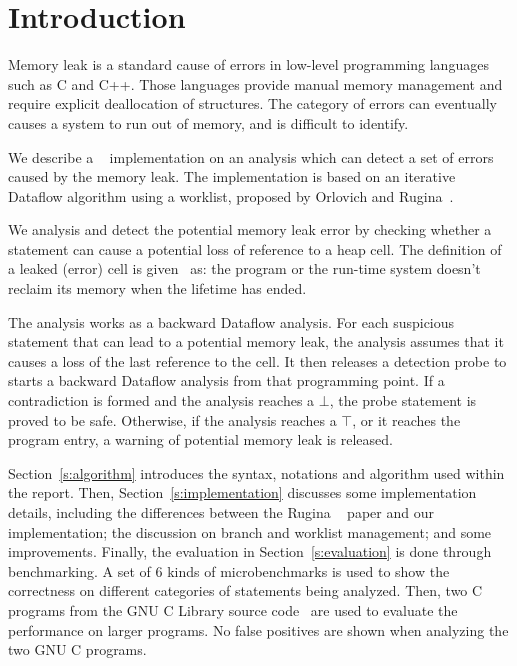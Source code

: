 \section{Introduction}
Memory leak is a standard cause of errors in low-level programming languages
such as C and C++. Those languages provide manual memory management and require
explicit deallocation of structures. The category of errors can eventually
causes a system to run out of memory, and is difficult to identify.

We describe a \llvm~\cite{llvm} implementation on an analysis which
can detect a set of errors caused by the memory leak. The implementation is
based on an iterative Dataflow algorithm using a worklist, proposed by Orlovich 
and Rugina~\cite{rugina}.

We analysis and detect the potential memory leak error
by checking whether a statement can cause a potential loss of reference to a 
heap cell. The definition of a leaked (error) cell is given~\cite{rugina} as: the 
program or the run-time system doesn't reclaim its memory when the lifetime 
has ended.

The analysis works as a backward Dataflow analysis. For each suspicious 
statement that can lead to a potential memory leak, the analysis assumes that 
it causes a loss of the last reference to the cell.
It then releases a detection probe to starts a backward 
Dataflow analysis from that programming point. If a contradiction is formed 
and the analysis reaches a $\bot$, the probe statement is proved to be safe. 
Otherwise, if the analysis reaches a $\top$, or it reaches the program entry, 
a warning of potential memory leak is released.

Section~\ref{s:algorithm} introduces the syntax, notations and algorithm
used within the report. Then, Section~\ref{s:implementation} discusses 
some implementation details, including the differences between the Rugina
~\cite{rugina} paper and our implementation; the discussion 
on branch and worklist management; and some improvements. 
Finally, the evaluation in Section~\ref{s:evaluation} is done through 
benchmarking. A set of 6 kinds
of microbenchmarks is used to show the correctness on different categories of
statements being analyzed. Then, two C programs from the GNU C Library source
code~\cite{glibc} are used to evaluate the performance on larger programs. No 
false positives are shown when analyzing the two GNU C programs.
